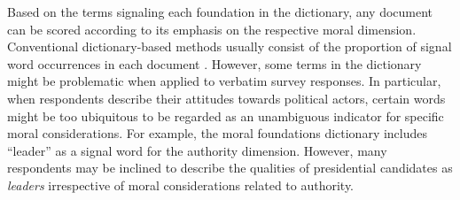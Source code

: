 \documentclass[12pt]{article}
\begin{document}
Based on the terms signaling each foundation in the dictionary, any document can be scored according to its emphasis on the respective moral dimension. Conventional dictionary-based methods usually consist of the proportion of signal word occurrences in each document \citep[e.g.][]{graham2009liberals}. However, some terms in the dictionary might be problematic when applied to verbatim survey responses. In particular, when respondents describe their attitudes towards political actors, certain words might be too ubiquitous to be regarded as an unambiguous indicator for specific moral considerations. For example, the moral foundations dictionary includes ``leader'' as a signal word for the authority dimension. However, many respondents may be inclined to describe the qualities of presidential candidates as \textit{leaders} irrespective of moral considerations related to authority.
\end{document}
